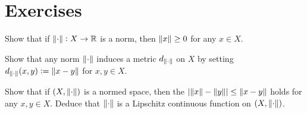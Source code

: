 \section*{Exercises}

\begin{exercise}
	Show that if $\norm[0]{\cdot}: X \to \mathbb{R}$ is a norm, then $\norm[0]{x} \geq 0$ for any $x \in X$.
\end{exercise}

\begin{exercise}
	Show that any norm $\norm[0]{\cdot}$ induces a metric $d_{\norm[0]{\cdot}}$ on $X$ by setting $d_{\norm[0]{\cdot}}(x,y) := \norm[0]{x - y}$ for $x,y \in X$.
\end{exercise}

\begin{exercise}
	Show that if $(X,\norm[0]{\cdot})$ is a normed space, then the  $\abs[0]{\norm[0]{x} - \norm[0]{y}} \leq \norm[0]{x - y}$ holds for any $x,y \in X$. Deduce that $\norm[0]{\cdot}$ is a Lipschitz continuous function on $(X,\norm[0]{\cdot})$.
	\label{ex:reverse_triangle_inequality}
\end{exercise}

